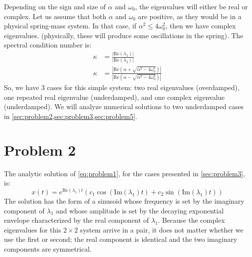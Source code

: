 \documentclass[10pt,letterpaper,notitlepage]{article}
\begin{document}
    Depending on the sign and size of $\alpha$ and $\omega_0$, the eigenvalues will either be real or complex. Let us assume that both $\alpha$ and $\omega_0$ are positive, as they would be in a physical spring-mass system. In that case, if $\alpha^2 \leq 4 \omega_0^2$, then we have complex eigenvalues. (physically, these will produce some oscillations in the spring).
    The spectral condition number is:
    \begin{equation}
        \begin{aligned}
            \kappa &= \frac{|\text{Re}(\lambda_1)|}{|\text{Re}(\lambda_2)|} \\
            \kappa &= \frac{| \text{Re}(\alpha + \sqrt{\alpha^2 - 4 \omega_0^2})|}{|\text{Re}(\alpha - \sqrt{\alpha^2 - 4 \omega_0^2})|}
        \end{aligned}
    \end{equation}
    So, we have 3 cases for this simple system: two real eigenvalues (overdamped), one repeated real eigenvalue (underdamped), and one complex eigenvalue (underdamped). We will analyze numerical solutions to two underdamped cases in \cref{sec:problem2,sec:problem3,sec:problem5}.
    \section{Problem 2}
    \label{sec:problem2}
    The analytic solution of \cref{eq:problem1}, for the cases presented in \cref{sec:problem3}, is:
    \begin{equation}
        x(t) = e^{\text{Re}(\lambda_1) t} (c_1 \cos(\text{Im}(\lambda_1) t) + c_2 \sin(\text{Im}(\lambda_1) t))
    \end{equation}
    The solution has the form of a sinusoid whose frequency is set by the imaginary component of $\lambda_1$ and whose amplitude is set by the decaying exponential envelope characterized by the real component of $\lambda_1$. Because the complex eigenvalues for this $2\times 2$ system arrive in a pair, it does not matter whether we use the first or second; the real component is identical and the two imaginary components are symmetrical.
\end{document}
